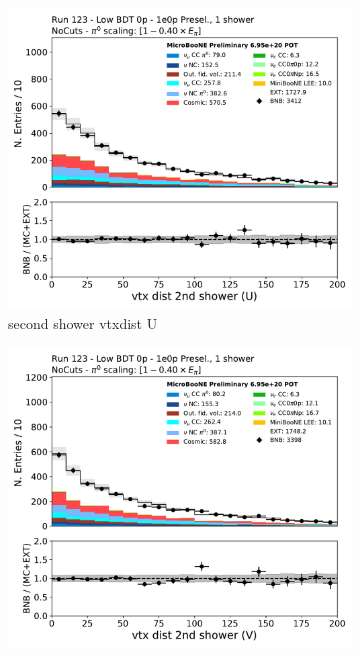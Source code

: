 \begin{figure}[H]
    \centering
    \begin{subfigure}{0.3\textwidth}
    \includegraphics[width=1.0\textwidth]{1e0p/Low_BDT_Sideband/secondshower_U_vtxdist.pdf}
    \caption{second shower vtxdist U}
    \end{subfigure}
    \begin{subfigure}{0.3\textwidth}
    \includegraphics[width=1.0\textwidth]{1e0p/Low_BDT_Sideband/secondshower_V_vtxdist.pdf}

\end{subfigure}
\end{figure}
